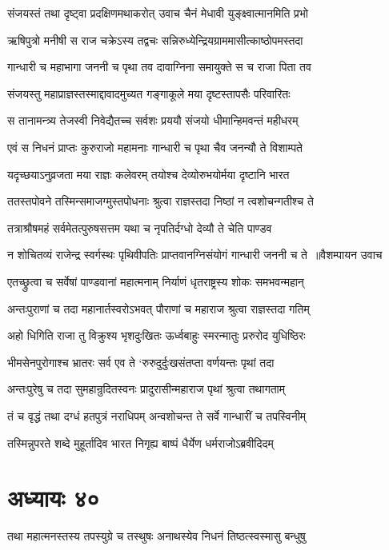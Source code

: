\twolineshloka
{संजयस्तं तथा दृष्ट्वा प्रदक्षिणमथाकरोत्}
{उवाच चैनं मेधावी युङ्क्ष्वात्मानमिति प्रभो}


\twolineshloka
{ऋषिपुत्रो मनीषी स राज चक्रेऽस्य तद्वचः}
{सन्निरुध्येन्द्रियग्राममासीत्काष्ठोपमस्तदा}


\twolineshloka
{गान्धारी च महाभागा जननी च पृथा तव}
{दावाग्निना समायुक्ते स च राजा पिता तव}


\twolineshloka
{संजयस्तु महाप्राज्ञस्तस्माद्दावादमुच्यत}
{गङ्गाकूले मया दृष्टस्तापसैः परिवारितः}


\twolineshloka
{स तानामन्त्र्य तेजस्वी निवेद्यैतच्च सर्वशः}
{प्रययौ संजयो धीमान्हिमवन्तं महीधरम्}


\twolineshloka
{एवं स निधनं प्राप्तः कुरुराजो महामनाः}
{गान्धारी च पृथा चैव जनन्यौ ते विशाम्पते}


\twolineshloka
{यदृच्छयाऽनुव्रजता मया राज्ञः कलेवरम्}
{तयोश्च देव्योरुभयोर्मया दृष्टानि भारत}


\twolineshloka
{ततस्तपोवने तस्मिन्समाजग्मुस्तपोधनाः}
{श्रुत्वा राज्ञस्तदा निष्ठां न त्वशोचन्गतीश्च ते}


\twolineshloka
{तत्राश्रौषमहं सर्वमेतत्पुरुषसत्तम}
{यथा च नृपतिर्दग्धो देव्यौ ते चेति पाण्डव}


\threelineshloka
{न शोचितव्यं राजेन्द्र स्वर्गस्थः पृथिवीपतिः}
{प्राप्तवानग्निसंयोगं गान्धारी जननी च ते ॥वैशम्पायन उवाच}
{}


\twolineshloka
{एतच्छ्रुत्वा च सर्वेषां पाण्डवानां महात्मनाम्}
{निर्याणं धृतराष्ट्रस्य शोकः समभवन्महान्}


\twolineshloka
{अन्तःपुराणां च तदा महानार्तस्वरोऽभवत्}
{पौराणां च महाराज श्रुत्वा राज्ञस्तदा गतिम्}


\twolineshloka
{अहो धिगिति राजा तु विक्रुश्य भृशदुःखितः}
{ऊर्ध्वबाहुः स्मरन्मातुः प्ररुरोद युधिष्ठिरः}


\twolineshloka
{भीमसेनपुरोगाश्च भ्रातरः सर्व एव ते}
{`रुरुदुर्दुःखसंतप्ता वर्णयन्तः पृथां तदा}


\twolineshloka
{अन्तःपुरेषु च तदा सुमहान्रुदितस्वनः}
{प्रादुरासीन्महाराज पृथां श्रुत्वा तथागताम्}


\twolineshloka
{तं च वृद्धं तथा दग्धं हतपुत्रं नराधिपम्}
{अन्वशोचन्त ते सर्वे गान्धारीं च तपस्विनीम्}


\twolineshloka
{तस्मिन्नुपरते शब्दे मुहूर्तादिव भारत}
{निगृह्य बाष्पं धैर्येण धर्मराजोऽब्रवीदिदम्}


\chapter{अध्यायः ४०}
\twolineshloka
{तथा महात्मनस्तस्य तपस्युग्रे च तस्थुषः}
{अनाथस्येव निधनं तिष्ठत्स्वस्मासु बन्धुषु}


